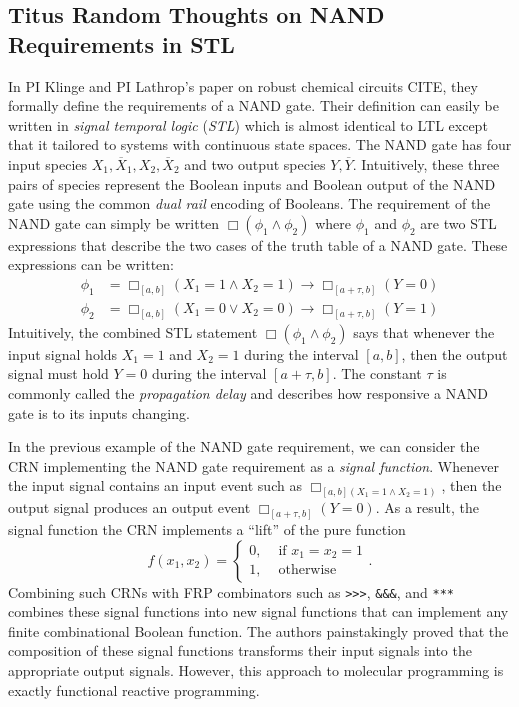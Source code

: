 \subsection*{Titus Random Thoughts on NAND Requirements in STL}
In PI Klinge and PI Lathrop's paper on robust chemical circuits CITE, they formally define the requirements of a NAND gate.
Their definition can easily be written in \emph{signal temporal logic} (\emph{STL}) which is almost identical to LTL except that it tailored to systems with continuous state spaces.
The NAND gate has four input species \( X_1, \overline{X}_1, X_2, \overline{X}_2  \) and two output species \( Y, \overline{Y} \).
Intuitively, these three pairs of species represent the Boolean inputs and Boolean output of the NAND gate using the common \emph{dual rail} encoding of Booleans.
The requirement of the NAND gate can simply be written \( \Box(\phi_1 \land \phi_2) \) where \( \phi_1 \) and \( \phi_2 \) are two STL expressions that describe the two cases of the truth table of a NAND gate.
These expressions can be written:
\begin{align*}
    \phi_1 &= \Box_{[a,b]} (X_1 = 1 \land X_2 = 1) \rightarrow \Box_{[a+\tau, b]} (Y = 0)\\
    \phi_2 &= \Box_{[a,b]} (X_1 = 0 \lor X_2 = 0)  \rightarrow \Box_{[a+\tau, b]} (Y = 1)
\end{align*}
Intuitively, the combined STL statement \( \Box(\phi_1 \land \phi_2) \) says that whenever the input signal holds \( X_1 = 1 \) and \( X_2 = 1 \) during the interval \( [a,b] \), then the output signal must hold \( Y = 0 \) during the interval \( [a+\tau, b] \).
The constant \( \tau \) is commonly called the \emph{propagation delay} and describes how responsive a NAND gate is to its inputs changing.

In the previous example of the NAND gate requirement, we can consider the CRN implementing the NAND gate requirement as a \emph{signal function}.
Whenever the input signal contains an input event such as \( \Box_{[a,b](X_1 = 1 \land X_2 = 1)} \), then the output signal produces an output event \( \Box_{[a+\tau, b]}(Y = 0) \).
As a result, the signal function the CRN implements a ``lift'' of the pure function
\[
    f(x_1, x_2) =
    \begin{cases}
        0, &\text{ if }x_1 = x_2 = 1\\
        1, &\text{ otherwise}
    \end{cases}.
\]
Combining such CRNs with FRP combinators such as \lstinline!>>>!, \lstinline!&&&!, and \lstinline!***! combines these signal functions into new signal functions that can implement any finite combinational Boolean function.
The authors painstakingly proved that the composition of these signal functions transforms their input signals into the appropriate output signals.
However, this approach to molecular programming is exactly functional reactive programming.

